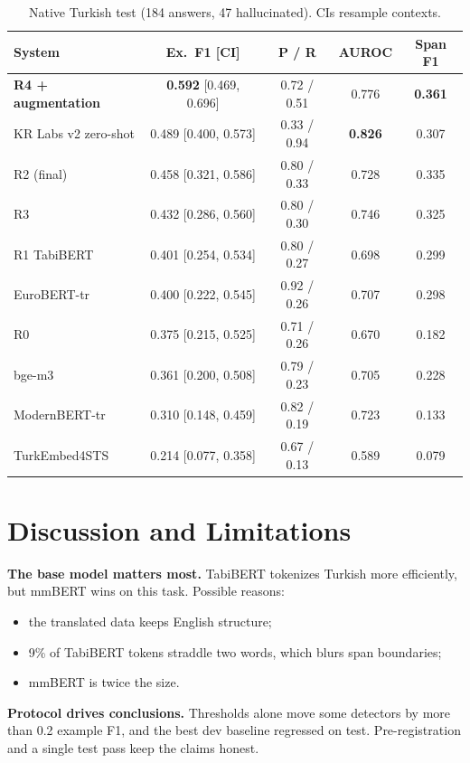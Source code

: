 \documentclass[conference,a4paper]{IEEEtran}
\begin{document}
\begin{table}[t]
\centering
\caption{Native Turkish test (184 answers, 47 hallucinated). CIs resample contexts.}
\label{tab:native}
\scriptsize
\setlength{\tabcolsep}{3pt}
\begin{tabular}{@{}lcccc@{}}
\toprule
System & Ex.\ F1 [CI] & P / R & AUROC & Span F1 \\
\midrule
\textbf{R4 + augmentation} & \textbf{0.592} [0.469, 0.696] & 0.72 / 0.51 & 0.776 & \textbf{0.361} \\
KR Labs v2 zero-shot & 0.489 [0.400, 0.573] & 0.33 / 0.94 & \textbf{0.826} & 0.307 \\
R2 (final) & 0.458 [0.321, 0.586] & 0.80 / 0.33 & 0.728 & 0.335 \\
R3 & 0.432 [0.286, 0.560] & 0.80 / 0.30 & 0.746 & 0.325 \\
R1 TabiBERT & 0.401 [0.254, 0.534] & 0.80 / 0.27 & 0.698 & 0.299 \\
EuroBERT-tr & 0.400 [0.222, 0.545] & 0.92 / 0.26 & 0.707 & 0.298 \\
R0 & 0.375 [0.215, 0.525] & 0.71 / 0.26 & 0.670 & 0.182 \\
bge-m3 & 0.361 [0.200, 0.508] & 0.79 / 0.23 & 0.705 & 0.228 \\
ModernBERT-tr & 0.310 [0.148, 0.459] & 0.82 / 0.19 & 0.723 & 0.133 \\
TurkEmbed4STS & 0.214 [0.077, 0.358] & 0.67 / 0.13 & 0.589 & 0.079 \\
\bottomrule
\end{tabular}
\end{table}

\section{Discussion and Limitations}
\textbf{The base model matters most.} TabiBERT tokenizes Turkish more efficiently, but mmBERT wins on this task. Possible reasons:
\begin{itemize}
\item the translated data keeps English structure;
\item 9\% of TabiBERT tokens straddle two words, which blurs span boundaries;
\item mmBERT is twice the size.
\end{itemize}

\textbf{Protocol drives conclusions.} Thresholds alone move some detectors by more than 0.2 example F1, and the best dev baseline regressed on test. Pre-registration and a single test pass keep the claims honest.
\end{document}
